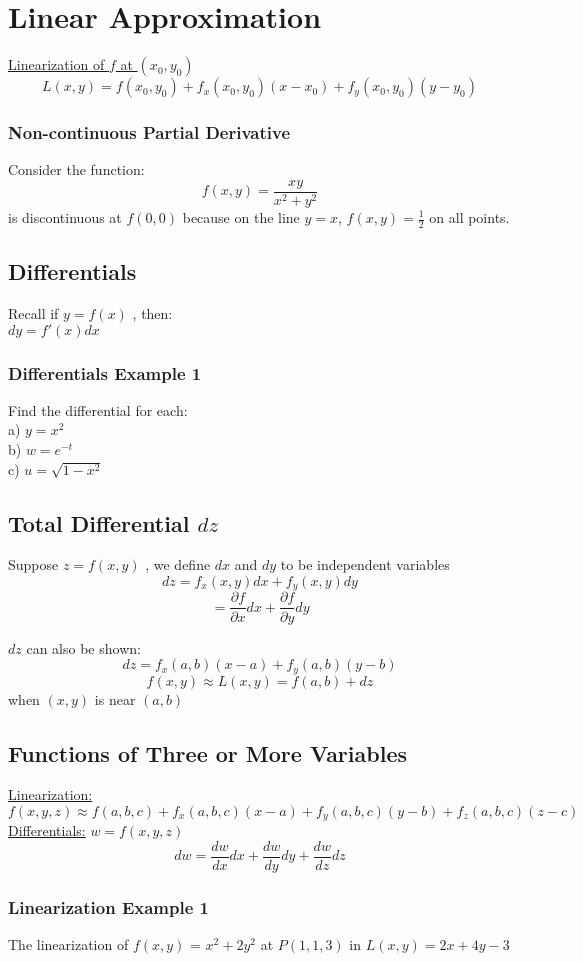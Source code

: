\documentclass[12pt]{article}
\begin{document}
\section{Linear Approximation}
\underline{Linearization of \(f\) at \((x_0,y_0)\) }
\[
	L(x,y) = f(x_0,y_0) + f_x(x_0,y_0)(x-x_0) + f_y(x_0,y_0)(y-y_0)
\]
\subsubsection{Non-continuous Partial Derivative}
Consider the function:
\[
	f(x,y) = \frac{xy}{x^2+y^2}
\]
is discontinuous at \(f(0,0)\) because on the line \(y=x\), \(f(x,y) = \frac{1}{2}\) on all points.


\subsection{Differentials}
Recall if \(y=f(x)\) , then: \\
\(dy=f'(x)dx\) 

\subsubsection{Differentials Example 1}
Find the differential for each:\\
a) \(y=x^2\) \\
b) \(w=e^{-t}\) \\
c) \(u=\sqrt{1-x^2}\) 

\subsection{Total Differential \(dz\) }
Suppose \(z=f(x,y)\) , we define \(dx\) and \(dy\) to be independent variables\
\[
	dz = f_x(x,y)dx + f_y(x,y)dy
\]
\[
	=\frac{\partial f}{\partial x} dx + \frac{\partial f}{\partial y} dy
\]

\(dz\) can also be shown:
\[
	dz=f_x(a,b)(x-a) + f_y(a,b)(y-b)
\]
\[
	f(x,y) \approx L(x,y) = f(a,b) + dz
\]
when \((x,y)\) is near \((a,b)\) 

\subsection{Functions of Three or More Variables}
\underline{Linearization:}
\[
	f(x,y,z) \approx f(a,b,c) + f_x(a,b,c)(x-a) + f_y(a,b,c)(y-b) + f_z(a,b,c)(z-c)
\]
\underline{Differentials:} \(w=f(x,y,z)\) 
\[
	dw=\frac{dw}{dx}dx + \frac{dw}{dy}dy + \frac{dw}{dz}dz
\]
\subsubsection{Linearization Example 1}
The linearization of \(f(x,y)\) = \(x^2+2y^2\) at \(P(1,1,3)\) in \(L(x,y) = 2x+4y-3\) 
\end{document}
